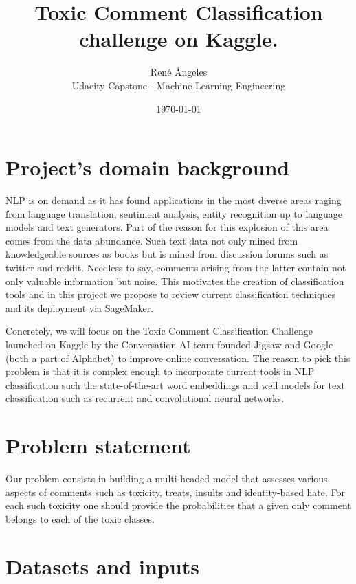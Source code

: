\documentclass[book,preprintnumbers,11pt]{article}
\begin{document}
\title{Toxic Comment Classification challenge on Kaggle.}
\author{Ren\'e  \'Angeles\\
  Udacity Capstone - Machine Learning Engineering \\
  }
\date{\today}
\maketitle




\section{Project's domain background}

NLP is on demand as it has found applications in the most diverse 
areas raging from language translation, sentiment analysis, entity recognition up to language models and text
generators.  Part of the reason for this explosion of this area 
comes from the data abundance. Such text data not only mined from 
knowledgeable  sources as books but is mined from discussion forums such as
twitter and reddit. Needless to say,  comments arising from the latter contain 
not only valuable information but noise. This motivates the creation of 
classification tools and in this project we propose to review
current classification techniques and its deployment via SageMaker. 

Concretely, we will focus on the Toxic Comment Classification Challenge launched
on Kaggle by the Conversation AI team  \cite{kaggle} founded Jigsaw and Google (both a part of Alphabet) 
to improve online conversation. The reason to pick this problem is that 
it is complex enough to incorporate current tools in NLP classification 
such the state-of-the-art word embeddings and well models for 
text classification such as recurrent and convolutional neural networks. 


\section{Problem statement}

Our problem consists in building a multi-headed model that assesses various aspects of comments 
such as  toxicity, treats, insults and identity-based hate. For each such toxicity one should 
provide the probabilities that a given only comment belongs to each of the toxic classes. 

\section{Datasets and inputs}
\end{document}
